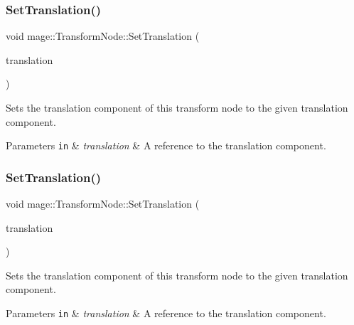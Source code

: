 \subsubsection{\texorpdfstring{Set\+Translation()}{SetTranslation()}\hspace{0.1cm}{\footnotesize\ttfamily [2/3]}}
{\footnotesize\ttfamily void mage\+::\+Transform\+Node\+::\+Set\+Translation (\begin{DoxyParamCaption}\item[{const X\+M\+F\+L\+O\+A\+T3 \&}]{translation }\end{DoxyParamCaption})}

Sets the translation component of this transform node to the given translation component.


\begin{DoxyParams}[1]{Parameters}
\mbox{\tt in}  & {\em translation} & A reference to the translation component. \\
\hline
\end{DoxyParams}
\hypertarget{classmage_1_1_transform_node_a0a6d54024fa758d7c4412e53e467b00c}{}\label{classmage_1_1_transform_node_a0a6d54024fa758d7c4412e53e467b00c} 
\subsubsection{\texorpdfstring{Set\+Translation()}{SetTranslation()}\hspace{0.1cm}{\footnotesize\ttfamily [3/3]}}
{\footnotesize\ttfamily void mage\+::\+Transform\+Node\+::\+Set\+Translation (\begin{DoxyParamCaption}\item[{const X\+M\+V\+E\+C\+T\+OR \&}]{translation }\end{DoxyParamCaption})}

Sets the translation component of this transform node to the given translation component.


\begin{DoxyParams}[1]{Parameters}
\mbox{\tt in}  & {\em translation} & A reference to the translation component. \\
\hline
\end{DoxyParams}
\hypertarget{classmage_1_1_transform_node_ae8c70df952ab17950a48decbc14ab09d}{}\label{classmage_1_1_transform_node_ae8c70df952ab17950a48decbc14ab09d} 
